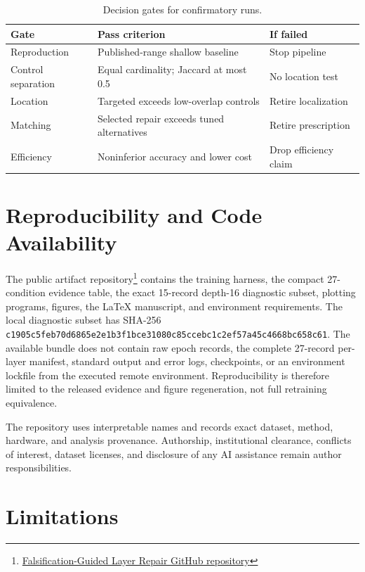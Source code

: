 \documentclass[journal]{IEEEtran}
\begin{document}
\begin{table}[t]
\caption{Decision gates for confirmatory runs.}
\label{tab:gates}
\centering
\scriptsize
\setlength{\tabcolsep}{2pt}
\begin{tabular}{p{}p{}p{}}
\toprule
Gate & Pass criterion & If failed \\
\midrule
Reproduction & Published-range shallow baseline & Stop pipeline \\
Control separation & Equal cardinality; Jaccard at most 0.5 & No location test \\
Location & Targeted exceeds low-overlap controls & Retire localization \\
Matching & Selected repair exceeds tuned alternatives & Retire prescription \\
Efficiency & Noninferior accuracy and lower cost & Drop efficiency claim \\
\bottomrule
\end{tabular}
\end{table}

\section{Reproducibility and Code Availability}

The public artifact repository\footnote{\href{https://github.com/kacytran1122/falsification-guided-layer-repair}{Falsification-Guided Layer Repair GitHub repository}} contains the training harness, the compact 27-condition evidence table, the exact 15-record depth-16 diagnostic subset, plotting programs, figures, the LaTeX manuscript, and environment requirements. The local diagnostic subset has SHA-256 \texttt{c1905c5feb70d6865\allowbreak e2e1b3f1bce31080\allowbreak c85ccebc1c2ef57a\allowbreak 45c4668bc658c61}. The available bundle does not contain raw epoch records, the complete 27-record per-layer manifest, standard output and error logs, checkpoints, or an environment lockfile from the executed remote environment. Reproducibility is therefore limited to the released evidence and figure regeneration, not full retraining equivalence.

The repository uses interpretable names and records exact dataset, method, hardware, and analysis provenance. Authorship, institutional clearance, conflicts of interest, dataset licenses, and disclosure of any AI assistance remain author responsibilities.

\section{Limitations}
\end{document}
